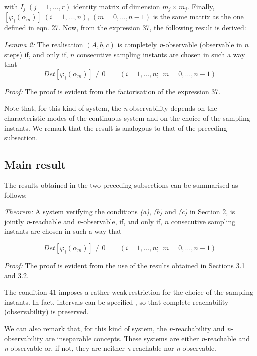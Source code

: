 \documentclass{article}
\begin{document}
with $I_j \; (j=1, \ldots , r)$
identity matrix of dimension $m_j \times m_j$. Finally, $[\varphi_i(\alpha_{m})] \; (i = 1, \ldots, n), \,(m = 0, \ldots
, n - 1)$ is the same matrix as the one defined in eqn. 27. Now,
from the expression 37, the following result is derived:


\textit{Lemma 2:}
The realisation $(A, b, c)$ is completely \textit{n}-observable (observable in
$n$ steps) if, and only if, $n$ consecutive sampling instants are
chosen in such a way that
\begin{equation}\label{eq:40}
 Det[ \varphi_i(\alpha_{m})] \neq 0 \qquad (i = 1, \ldots, n; \;\, m = 0, \ldots, n-1)
\end{equation}

\textit{Proof:} The proof is evident from the
factorisation of the expression 37.


Note that, for this kind of system, the \textit{n}-observability depends on the characteristic modes of
the continuous system and on the choice of the sampling instants.
We remark that the result is analogous to that of the preceding
subsection.



\subsection{Main result}
The results obtained in the two
preceding subsections can be summarised as follows:


\textit{Theorem:} A
system verifying the conditions \textit{(a)}, \textit{(b)} and \textit{(c)} in Section 2, is
jointly \textit{n}-reachable and \textit{n}-observable, if, and only if, $n$
consecutive sampling instants are chosen in such a way that

\begin{equation}\label{eq:41}
 Det[ \varphi_i(\alpha_{m})] \neq 0 \qquad (i = 1, \ldots, n; \;\, m = 0, \ldots, n-1)
\end{equation}

\textit{Proof:} The
proof is evident from the use of the results obtained in Sections
3.1 and 3.2.

The condition 41 imposes a rather weak restriction
for the choice of the sampling instants. In fact, intervals can be
specified \cite{Fuster}, \cite{Troch} so that complete reachability (observability) is
preserved.

We can also remark that, for this kind of system, the
\textit{n}-reachability and \textit{n}-observability are inseparable concepts. These
systems are either \textit{n}-reachable and \textit{n}-observable or, if not, they
are neither \textit{n}-reachable nor \textit{n}-observable.
\end{document}
